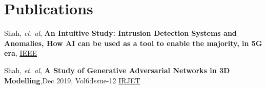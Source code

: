 \section{Publications}
 \begin{itemize}[leftmargin=0.15in, label={}]
    \small{
    \item{
    Shah, \textit{et. al}, \textbf{An Intuitive Study: Intrusion Detection Systems and Anomalies, How AI can be used as a tool to enable the majority, in 5G era}, \href{https://ieeexplore.ieee.org/document/9128786}{IEEE}}
    \item{
    Shah, \textit{et. al}, \textbf{A Study of Generative Adversarial Networks in 3D Modelling},Dec 2019, Vol6:Issue-12 \href{https://www.irjet.net/archives/V6/i12/IRJET-V6I12121.pdf}{IRJET}
    }
    }
 \end{itemize}